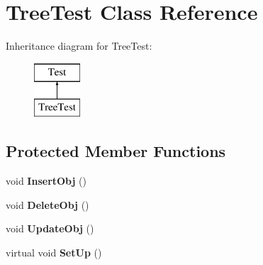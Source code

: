 \hypertarget{classTreeTest}{\section{Tree\-Test Class Reference}
\label{classTreeTest}
}
Inheritance diagram for Tree\-Test\-:\begin{figure}[H]
\begin{center}
\leavevmode
\includegraphics[height=2.000000cm]{classTreeTest}
\end{center}
\end{figure}
\subsection*{Protected Member Functions}
\begin{DoxyCompactItemize}
\item 
\hypertarget{classTreeTest_adaa57828d45a89aadacd259a0e69790a}{void {\bfseries Insert\-Obj} ()}\label{classTreeTest_adaa57828d45a89aadacd259a0e69790a}

\item 
\hypertarget{classTreeTest_a9ab561b627cc999d4c89f94ea53d291b}{void {\bfseries Delete\-Obj} ()}\label{classTreeTest_a9ab561b627cc999d4c89f94ea53d291b}

\item 
\hypertarget{classTreeTest_ae5d5b1281cfa1438ba792ae65f0f6341}{void {\bfseries Update\-Obj} ()}\label{classTreeTest_ae5d5b1281cfa1438ba792ae65f0f6341}

\item 
\hypertarget{classTreeTest_a50caa23d3a9be5549c5b26fe78412602}{virtual void {\bfseries Set\-Up} ()}\label{classTreeTest_a50caa23d3a9be5549c5b26fe78412602}

\end{DoxyCompactItemize}
